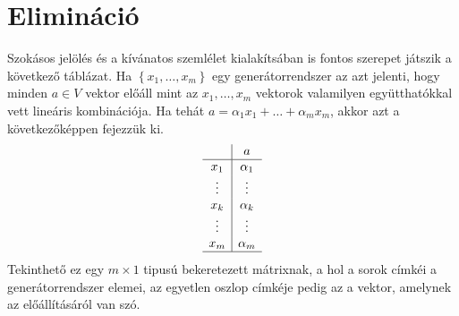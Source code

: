 \documentclass[9pt, showtrims]{memoir}
\theoremstyle{plain}
\theoremstyle{remark}
\theoremstyle{definition}
\begin{document}
\section{Elimináció}
Szokásos jelölés és a kívánatos szemlélet kialakítsában is fontos szerepet játszik a következő táblázat.
Ha $\left\{ x_1,\dots,x_m \right\}$ egy generátorrendszer az azt jelenti, hogy minden $a\in V$ vektor
előáll mint az $x_1,\dots,x_m$ vektorok valamilyen együtthatókkal vett lineáris kombinációja.
Ha tehát $a=\alpha_1x_1+\dots+\alpha_mx_m$, akkor azt a következőképpen fejezzük ki.
\[
    \begin{array}{c|c}
                    &a         \\
        \hline
        x_1         &\alpha_1   \\
        \vdots      &\vdots    \\
        x_k         &\alpha_k   \\
        \vdots      &\vdots    \\
        x_m         &\alpha_m   \\
        \hline
    \end{array}
\]
Tekinthető ez egy $m\times 1$ tipusú bekeretezett mátrixnak, a hol a sorok címkéi a generátorrendszer elemei,
az egyetlen oszlop címkéje pedig az a vektor, amelynek az előállításáról van szó.
\end{document}
